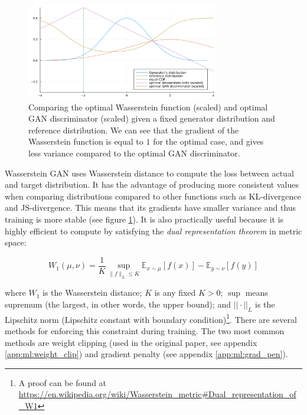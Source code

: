 \begin{figure}
    \centering
    \includegraphics[width=0.75\textwidth]{images/preliminary/wgan_vs_gan_grad.png}
    \caption[Comparing the optimal Wasserstein function (scaled) and optimal GAN discriminator (scaled) given a fixed generator distribution and reference distribution.]{Comparing the optimal Wasserstein function (scaled) and optimal GAN discriminator (scaled) given a fixed generator distribution and reference distribution. We can see that the gradient of the Wasserstein function is equal to $1$ for the optimal case, and gives less variance compared to the optimal GAN discriminator.\cite{FileWassersteinGANCritic}} 
    \label{fig:wgan_vs_gan_grad}
\end{figure}

Wasserstein GAN uses Wasserstein distance to compute the loss between actual and target distribution. It has the advantage of producing more consistent values when comparing distributions compared to other functions such as KL-divergence and JS-divergence. This means that its gradients have smaller variance and thus training is more stable (see figure \ref{fig:wgan_vs_gan_grad}). It is also practically useful because it is highly efficient to compute by satisfying the \textit{dual representation theorem} in metric space:

$$
W_{1}(\mu, \nu)=\frac{1}{K} \sup _{\|f\|_{L} \leq K} \mathbb{E}_{x \sim \mu}[f(x)]-\mathbb{E}_{y \sim \nu}[f(y)]
$$

where $W_1$ is the Wasserstein distance; $K$ is any fixed $K > 0$; $\sup$ means supremum (the largest, in other words, the upper bound); and $||\cdot||_L$ is the Lipschitz norm (Lipschitz constant with boundary condition)\footnote{A proof can be found at \url{https://en.wikipedia.org/wiki/Wasserstein\_metric\#Dual\_representation\_of\_W1}}. There are several methods for enforcing this constraint during training. The two most common methods are weight clipping (used in the original paper, see appendix \ref{app:ml:weight_clip}) and gradient penalty (see appendix \ref{app:ml:grad_pen}).

